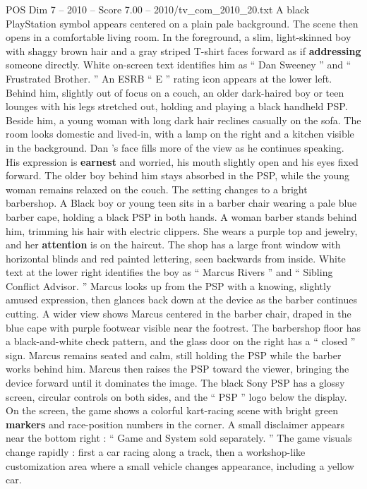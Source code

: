 \begin{textsample}{POS Dim 7 – 2010 – Score 7.00 – 2010/tv\_com\_2010\_20.txt}  \label{ex:f7_pos_059}
A black PlayStation symbol appears centered on a plain pale background.
The scene then opens in a comfortable living room.
In the foreground, a slim, light-skinned boy with shaggy brown hair and a gray striped T-shirt faces forward as if \textbf{addressing} someone directly.
White on-screen text identifies him as “ Dan Sweeney ” and “ Frustrated Brother. ” An ESRB “ E ” rating icon appears at the lower left.
Behind him, slightly out of focus on a couch, an older dark-haired boy or teen lounges with his legs stretched out, holding and playing a black handheld PSP.
Beside him, a young woman with long dark hair reclines casually on the sofa.
The room looks domestic and lived-in, with a lamp on the right and a kitchen visible in the background.
Dan ’s face fills more of the view as he continues speaking.
His expression is \textbf{earnest} and worried, his mouth slightly open and his eyes fixed forward.
The older boy behind him stays absorbed in the PSP, while the young woman remains relaxed on the couch.
The setting changes to a bright barbershop.
A Black boy or young teen sits in a barber chair wearing a pale blue barber cape, holding a black PSP in both hands.
A woman barber stands behind him, trimming his hair with electric clippers.
She wears a purple top and jewelry, and her \textbf{attention} is on the haircut.
The shop has a large front window with horizontal blinds and red painted lettering, seen backwards from inside.
White text at the lower right identifies the boy as “ Marcus Rivers ” and “ Sibling Conflict Advisor. ” Marcus looks up from the PSP with a knowing, slightly amused expression, then glances back down at the device as the barber continues cutting.
A wider view shows Marcus centered in the barber chair, draped in the blue cape with purple footwear visible near the footrest.
The barbershop floor has a black-and-white check pattern, and the glass door on the right has a “ closed ” sign.
Marcus remains seated and calm, still holding the PSP while the barber works behind him.
Marcus then raises the PSP toward the viewer, bringing the device forward until it dominates the image.
The black Sony PSP has a glossy screen, circular controls on both sides, and the “ PSP ” logo below the display.
On the screen, the game shows a colorful kart-racing scene with bright green \textbf{markers} and race-position numbers in the corner.
A small disclaimer appears near the bottom right : “ Game and System sold separately. ” The game visuals change rapidly : first a car racing along a track, then a workshop-like customization area where a small vehicle changes appearance, including a yellow car.

\end{textsample}
